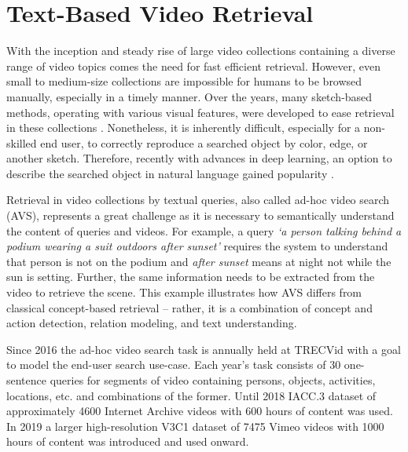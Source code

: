 \chapter{Text-Based Video Retrieval}
With the inception and steady rise of large video collections containing a diverse range of video topics comes the need for fast efficient retrieval. However, even small to medium-size collections are impossible for humans to be browsed manually, especially in a timely manner. Over the years, many sketch-based methods, operating with various visual features, were developed to ease retrieval in these collections \cite{KlausWikiView,BlazekAdam2015,KlausVBS2019_sketchsearch,LokocVBS2019_Nasnet}. Nonetheless, it is inherently difficult, especially for a non-skilled end user, to correctly reproduce a searched object by color, edge, or another sketch. Therefore, recently with advances in deep learning, an option to describe the searched object in natural language gained popularity \cite{SOMHunterVBS2020,LokocVBS2020_VIRET}. %


Retrieval in video collections by textual queries, also called ad-hoc video search (AVS), represents a great challenge as it is necessary to semantically understand the content of queries and videos. %
For example, a query \textit{`a person talking behind a podium wearing a suit outdoors after sunset'} requires the system to understand that person is not on the podium and \textit{after sunset} means at night not while the sun is setting. Further, the same information needs to be extracted from the video to retrieve the scene. This example illustrates how AVS differs from classical concept-based retrieval -- rather, it is a combination of concept and action detection, relation modeling, and text understanding.

Since 2016 the ad-hoc video search task is annually held at TRECVid with a goal to model the end-user search use-case. Each year's task consists of 30 one-sentence queries for segments of video containing persons, objects, activities, locations, etc. and combinations of the former.
Until 2018 IACC.3 dataset \cite{2017trecvidawad} of approximately 4600 Internet Archive videos with 600 hours of content was used. In 2019 a larger high-resolution V3C1 dataset \cite{V3C1dataset} of 7475 Vimeo videos with 1000 hours of content was introduced and used onward.

